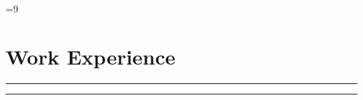 \documentclass{article}
\newcommand{\ruleLine}{
    \begin{center}
      \color{lines}
      \rule{0.5\textwidth}{.4pt}
    \end{center}
    \vspace{-5pt}
  }
\begin{document}
\color{body}

=9\relax     %

\raggedright

\fontsize{10pt}{13pt}\selectfont


\begin{minipage}[t]{\textwidth}
  
\end{minipage}
\vspace{15pt}

\begin{minipage}[t]{0.6\textwidth}
  \vspace{0pt}

  \section{Work Experience}

  

    \ruleLine

  

    \ruleLine

  

\end{minipage}
\hfill
\end{document}
